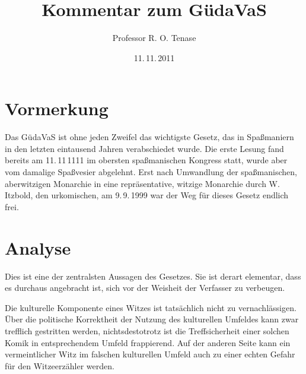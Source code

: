 \documentclass{scrartcl}
\begin{document}
\title{Kommentar zum GüdaVaS}
\author{Professor R. O. Tenase}
\date{11.\,11.\,2011}
\maketitle
\tableofcontents

\section{Vormerkung}
Das GüdaVaS ist ohne jeden Zweifel das wichtigste Gesetz, das in
Spaßmaniern in den letzten eintausend Jahren verabschiedet wurde. 
Die erste Lesung fand bereits am 11.\,11\,1111 im obersten 
spaßmanischen Kongress statt, wurde aber vom damalige Spaßvesier
abgelehnt. Erst nach Umwandlung der spaßmanischen, aberwitzigen Monarchie
in eine repräsentative, witzige Monarchie durch W. Itzbold, den
urkomischen, am 9.\,9.\,1999 war der Weg für dieses Gesetz endlich frei.

\section{Analyse}

\begin{addmargin}[0pt]{.333\textwidth}
  Dies ist eine der zentralsten Aussagen des Gesetzes. Sie ist derart
  elementar, dass es durchaus angebracht ist, sich vor der Weisheit der
  Verfasser zu verbeugen.

  \syncwithnotecolumn[paragraphs]\bigskip
  Die kulturelle Komponente eines Witzes ist tatsächlich nicht zu
  vernachlässigen. Über die politische Korrektheit der Nutzung des kulturellen
  Umfeldes kann zwar trefflich gestritten werden, nichtsdestotrotz ist die
  Treffsicherheit einer solchen Komik in entsprechendem Umfeld frappierend. Auf
  der anderen Seite kann ein vermeintlicher Witz im falschen kulturellen
  Umfeld auch zu einer echten Gefahr für den Witzeerzähler werden.
\end{addmargin}
\end{document}
